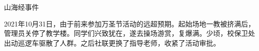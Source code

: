 \begin{section}{山海经事件}
	\label{story:山海经事件}

	2021年10月31日，由于前来参加万圣节活动的远超预期。起始场地一教被挤满后，管理员关停了教学楼。同学们兴致犹在，遂去操场游赏，复爆满。少顷，校保卫处出动巡逻车驱散了人群。之后社联更换了指导老师，收紧了活动审批。
\end{section}